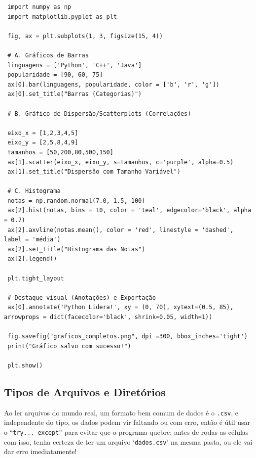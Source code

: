 \documentclass[../numerical_methods.tex]{subfiles}
\begin{document}
\begin{listing}[H]
	\caption{Barras, Scatterplots e Histograma}
	\begin{verbatim}
 import numpy as np 
 import matplotlib.pyplot as plt 

 fig, ax = plt.subplots(1, 3, figsize(15, 4))

 # A. Gráficos de Barras 
 linguagens = ['Python', 'C++', 'Java']
 popularidade = [90, 60, 75]
 ax[0].bar(linguagens, popularidade, color = ['b', 'r', 'g'])
 ax[0].set_title("Barras (Categorias)")

 # B. Gráfico de Dispersão/Scatterplots (Correlações)

 eixo_x = [1,2,3,4,5]
 eixo_y = [2,5,8,4,9]
 tamanhos = [50,200,80,500,150]
 ax[1].scatter(eixo_x, eixo_y, s=tamanhos, c='purple', alpha=0.5)
 ax[1].set_title("Dispersão com Tamanho Variável")

 # C. Histograma 
 notas = np.random.normal(7.0, 1.5, 100)
 ax[2].hist(notas, bins = 10, color = 'teal', edgecolor='black', alpha = 0.7)
 ax[2].axvline(notas.mean(), color = 'red', linestyle = 'dashed', label = 'média')
 ax[2].set_title("Histograma das Notas")
 ax[2].legend()

 plt.tight_layout

 # Destaque visual (Anotações) e Exportação
 ax[0].annotate('Python Lidera!', xy = (0, 70), xytext=(0.5, 85), arrowprops = dict(facecolor='black', shrink=0.05, width=1))

 fig.savefig("graficos_completos.png", dpi =300, bbox_inches='tight')
 print("Gráfico salvo com sucesso!")

 plt.show()
 \end{verbatim}
\end{listing}

\subsection{Tipos de Arquivos e Diretórios}
Ao ler arquivos do mundo real, um formato bem comum de dados é o \texttt{.csv}, e independente do tipo, os dados podem vir faltando ou com erro, então é útil usar o ``\texttt{try... except}'' para evitar que o programa quebre; antes de rodas as células com isso, tenha certeza de ter um arquivo `\texttt{dados.csv}' na mesma pasta, ou ele vai dar erro imediatamente!
\end{document}
